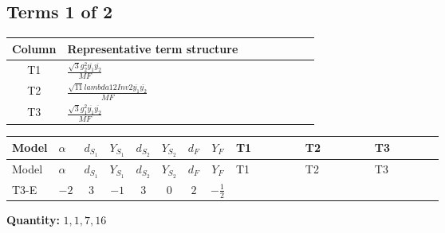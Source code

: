 \documentclass[8pt]{article}
\begin{document}
\begin{landscape}
\subsection*{Terms 1 of 2}
\begin{center}
\begin{tabular}{@{}c >{\raggedright\arraybackslash}p{0.82\linewidth}@{}}
\toprule
Column & Representative term structure \\
\midrule
T1 & \(\displaystyle \frac{\sqrt{3} g_{2}^{2} \overline{y_{1}} \overline{y_{2}}}{MF}\) \\
\midrule
T2 & \(\displaystyle \frac{\sqrt{11} lambda12Inv2 \overline{y_{1}} \overline{y_{2}}}{MF}\) \\
\midrule
T3 & \(\displaystyle \frac{\sqrt{3} g_{1}^{2} \overline{y_{1}} \overline{y_{2}}}{MF}\) \\
\midrule
\bottomrule
\end{tabular}
\end{center}
\smallskip
\tiny
\begin{longtable}{@{}llcccccc >{\raggedright\arraybackslash}p{0.21\linewidth} >{\raggedright\arraybackslash}p{0.21\linewidth} >{\raggedright\arraybackslash}p{0.21\linewidth}@{}}
\toprule
Model & $\alpha$ & $d_{S_1}$ & $Y_{S_1}$ & $d_{S_2}$ & $Y_{S_2}$ & $d_F$ & $Y_F$ & T1 & T2 & T3 \\
\midrule
\endfirsthead
\toprule
Model & $\alpha$ & $d_{S_1}$ & $Y_{S_1}$ & $d_{S_2}$ & $Y_{S_2}$ & $d_F$ & $Y_F$ & T1 & T2 & T3 \\
\midrule
\endhead
T3-E & $-2$ & $3$ & $-1$ & $3$ & $0$ & $2$ & $-\frac{1}{2}$ & \scriptsize\adjustbox{max width=\linewidth}{$\begin{gathered} - \frac{11 \sqrt{3} g_{2}^{2} \overline{y_{1}} \overline{y_{2}}}{8 MF}\end{gathered}$} & \scriptsize\adjustbox{max width=\linewidth}{$\begin{gathered} - \frac{3 \sqrt{11} lambda12Inv2 \overline{y_{1}} \overline{y_{2}}}{22 MF}\end{gathered}$} & \scriptsize\adjustbox{max width=\linewidth}{$\begin{gathered} - \frac{\sqrt{3} g_{1}^{2} \overline{y_{1}} \overline{y_{2}}}{8 MF}\end{gathered}$} \\
\midrule
\bottomrule
\end{longtable}
\clearpage
\noindent\textbf{Quantity: }$\mathrm{1,1,7,16}$\par\smallskip

\end{landscape}
\end{document}
